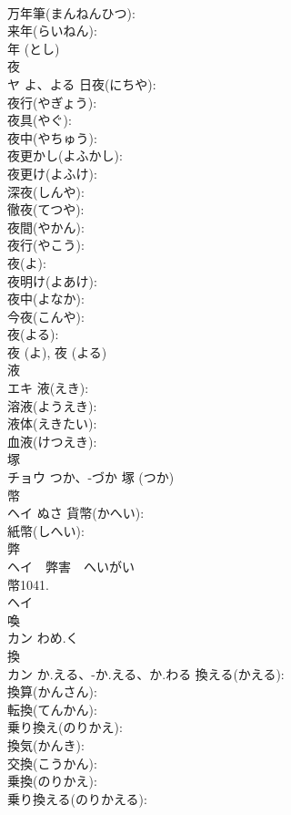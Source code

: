 \documentclass[8pt]{extreport}
\begin{document}
\begin{CJK}{UTF8}{min}
\\	万年筆(まんねんひつ): 
\\	来年(らいねん): 
\\	年 (とし)
\\	夜			
\\	ヤ	よ、よる	日夜(にちや): 
\\	夜行(やぎょう): 
\\	夜具(やぐ): 
\\	夜中(やちゅう): 
\\	夜更かし(よふかし): 
\\	夜更け(よふけ): 
\\	深夜(しんや): 
\\	徹夜(てつや): 
\\	夜間(やかん): 
\\	夜行(やこう): 
\\	夜(よ): 
\\	夜明け(よあけ): 
\\	夜中(よなか): 
\\	今夜(こんや): 
\\	夜(よる): 
\\	夜 (よ), 夜 (よる)
\\	液			
\\	エキ		液(えき): 
\\	溶液(ようえき): 
\\	液体(えきたい): 
\\	血液(けつえき): 
\\	塚			
\\	チョウ	つか、-づか		塚 (つか)
\\	幣			
\\	ヘイ	ぬさ	貨幣(かへい): 
\\	紙幣(しへい): 
\\	弊			
\\	ヘイ　弊害　へいがい
\\	幣1041.	
\\	ヘイ			
\\	喚			
\\	カン	わめ.く		
\\	換			
\\	カン	か.える、-か.える、か.わる	換える(かえる): 
\\	換算(かんさん): 
\\	転換(てんかん): 
\\	乗り換え(のりかえ): 
\\	換気(かんき): 
\\	交換(こうかん): 
\\	乗換(のりかえ): 
\\	乗り換える(のりかえる): 

\end{CJK}
\end{document}
